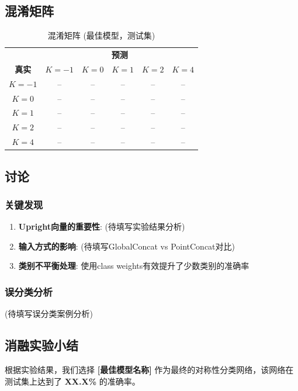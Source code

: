 \subsection{混淆矩阵}

\begin{table}[h]
\centering
\caption{混淆矩阵 (最佳模型，测试集)}
\label{tab:confusion_matrix}
\begin{tabular}{c|ccccc}
\hline
& \multicolumn{5}{c}{\textbf{预测}} \\
\textbf{真实} & $K=-1$ & $K=0$ & $K=1$ & $K=2$ & $K=4$ \\
\hline
$K=-1$ & -- & -- & -- & -- & -- \\
$K=0$ & -- & -- & -- & -- & -- \\
$K=1$ & -- & -- & -- & -- & -- \\
$K=2$ & -- & -- & -- & -- & -- \\
$K=4$ & -- & -- & -- & -- & -- \\
\hline
\end{tabular}
\end{table}

\subsection{讨论}

\subsubsection{关键发现}
\begin{enumerate}
    \item \textbf{Upright向量的重要性}: (待填写实验结果分析)
    \item \textbf{输入方式的影响}: (待填写GlobalConcat vs PointConcat对比)
    \item \textbf{类别不平衡处理}: 使用class weights有效提升了少数类别的准确率
\end{enumerate}

\subsubsection{误分类分析}
(待填写误分类案例分析)

\subsection{消融实验小结}

根据实验结果，我们选择 \textbf{[最佳模型名称]} 作为最终的对称性分类网络，该网络在测试集上达到了 \textbf{XX.X\%} 的准确率。

